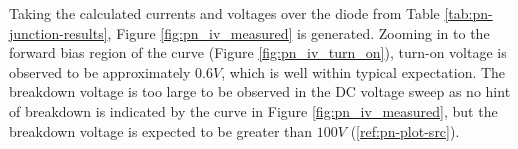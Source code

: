 \FloatBarrier

Taking the calculated currents and voltages over the diode from Table \ref{tab:pn-junction-results}, Figure \ref{fig:pn_iv_measured} is generated. Zooming in to the forward bias region of the curve (Figure \ref{fig:pn_iv_turn_on}), turn-on voltage is observed to be approximately $0.6 V$, which is well within typical expectation. The breakdown voltage is too large to be observed in the DC voltage sweep as no hint of breakdown is indicated by the curve in Figure \ref{fig:pn_iv_measured}, but the breakdown voltage is expected to be greater than $100 V$ (\ref{ref:pn-plot-src}).